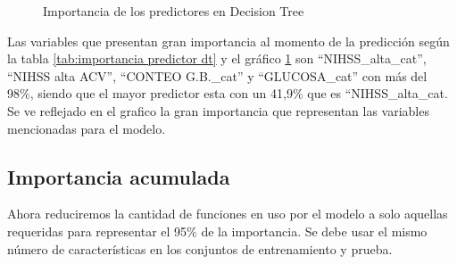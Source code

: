 \begin{center}
    	\begin{figure}[H]
	\centering

	\caption{Importancia de los predictores en Decision Tree}
	\label{fig:ipdt}
	\end{figure}
\end{center}
    
    Las variables que presentan gran importancia al momento de la predicción según la tabla \ref{tab:importancia predictor dt} y el gráfico \ref{fig:ipdt}
son ``NIHSS\_alta\_cat'', ``NIHSS alta ACV'', ``CONTEO G.B.\_cat'' y
``GLUCOSA\_cat'' con más del 98\%, siendo que el mayor predictor esta
con un 41,9\% que es ``NIHSS\_alta\_cat. Se ve reflejado en el grafico
la gran importancia que representan las variables mencionadas para el
modelo.

    \hypertarget{importancia-acumulada}{%
\subsection{Importancia acumulada}\label{importancia-acumulada}}

Ahora reduciremos la cantidad de funciones en uso por el modelo a solo
aquellas requeridas para representar el 95\% de la importancia. Se debe
usar el mismo número de características en los conjuntos de
entrenamiento y prueba.

